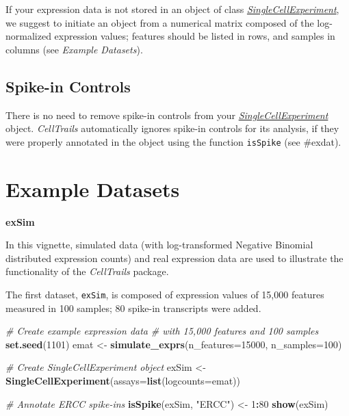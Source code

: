 \documentclass[]{book}
\newenvironment{Shaded}{\begin{snugshade}}{\end{snugshade}}
\newcommand{\KeywordTok}[1]{\textcolor[rgb]{0.13,0.29,0.53}{\textbf{#1}}}
\newcommand{\DataTypeTok}[1]{\textcolor[rgb]{0.13,0.29,0.53}{#1}}
\newcommand{\DecValTok}[1]{\textcolor[rgb]{0.00,0.00,0.81}{#1}}
\newcommand{\StringTok}[1]{\textcolor[rgb]{0.31,0.60,0.02}{#1}}
\newcommand{\CommentTok}[1]{\textcolor[rgb]{0.56,0.35,0.01}{\textit{#1}}}
\newcommand{\OperatorTok}[1]{\textcolor[rgb]{0.81,0.36,0.00}{\textbf{#1}}}
\newcommand{\NormalTok}[1]{#1}
\theoremstyle{definition}
\theoremstyle{definition}
\theoremstyle{definition}
\theoremstyle{remark}
\begin{document}
If your expression data is not stored in an object of class
\emph{\href{http://bioconductor.org/packages/SingleCellExperiment}{SingleCellExperiment}},
we suggest to initiate an object from a numerical matrix composed of the
log-normalized expression values; features should be listed in rows, and
samples in columns (see \emph{Example Datasets}).

\subsection{Spike-in Controls}\label{spike-in-controls}

There is no need to remove spike-in controls from your
\emph{\href{http://bioconductor.org/packages/SingleCellExperiment}{SingleCellExperiment}}
object. \emph{CellTrails} automatically ignores spike-in controls for
its analysis, if they were properly annotated in the object using the
function \texttt{isSpike} (see \#exdat).

\section{Example Datasets}\label{exdat}

\textbf{exSim}

In this vignette, simulated data (with log-transformed Negative Binomial
distributed expression counts) and real expression data are used to
illustrate the functionality of the \emph{CellTrails} package.

The first dataset, \texttt{exSim}, is composed of expression values of
15,000 features measured in 100 samples; 80 spike-in transcripts were
added.

\begin{Shaded}
\begin{Highlighting}[]
\CommentTok{# Create example expression data}
\CommentTok{# with 15,000 features and 100 samples}
\KeywordTok{set.seed}\NormalTok{(}\DecValTok{1101}\NormalTok{)}
\NormalTok{emat <-}\StringTok{ }\KeywordTok{simulate_exprs}\NormalTok{(}\DataTypeTok{n_features=}\DecValTok{15000}\NormalTok{, }\DataTypeTok{n_samples=}\DecValTok{100}\NormalTok{)}

\CommentTok{# Create SingleCellExperiment object}
\NormalTok{exSim <-}\StringTok{ }\KeywordTok{SingleCellExperiment}\NormalTok{(}\DataTypeTok{assays=}\KeywordTok{list}\NormalTok{(}\DataTypeTok{logcounts=}\NormalTok{emat))}

\CommentTok{# Annotate ERCC spike-ins }
\KeywordTok{isSpike}\NormalTok{(exSim, }\StringTok{"ERCC"}\NormalTok{) <-}\StringTok{ }\DecValTok{1}\OperatorTok{:}\DecValTok{80}
\KeywordTok{show}\NormalTok{(exSim)}
\end{Highlighting}
\end{Shaded}
\end{document}
